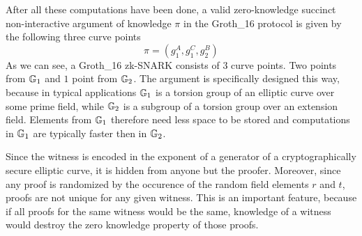 After all these computations have been done, a valid zero-knowledge succinct non-interactive argument of knowledge $\pi$ in the Groth\_16 protocol is given by the following three curve points
\begin{equation}
\pi = (g_1^A,g_1^C,g_2^B)
\end{equation}
As we can see, a Groth\_16 zk-SNARK consists of $3$ curve points. Two points from $\mathbb{G}_1$ and $1$ point from $\mathbb{G}_2$. The argument is specifically designed this way, because in typical applications $\mathbb{G}_1$ is a torsion group of an elliptic curve over some prime field, while $\mathbb{G}_2$ is a subgroup of a torsion group over an extension field. Elements from $\mathbb{G}_1$ therefore need less space to be stored and computations in $\mathbb{G}_1$ are typically faster then in $\mathbb{G}_2$.

Since the witness is encoded in the exponent of a generator of a cryptographically secure elliptic curve, it is hidden from anyone but the proofer. Moreover, since any proof is randomized by the occurence of the random field elements $r$ and $t$, proofs are not unique for any given witness. This is an important feature, because if all proofs for the same witness would be the same, knowledge of a witness would destroy the zero knowledge property of those proofs. 

